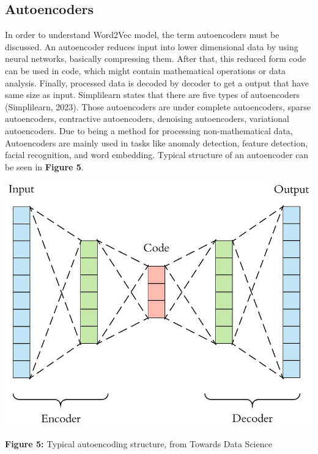 \documentclass[man]{apa7}
\begin{document}
\subsection{Autoencoders}

In order to understand Word2Vec model, the term autoencoders must be discussed. An autoencoder reduces input into lower dimensional data by using neural networks, basically compressing them. After that, this reduced form code can be used in code, which might contain mathematical operations or data analysis. Finally, processed data is decoded by decoder to get a output that have same size as input. Simplilearn states that there are five types of autoencoders (Simplilearn, 2023). Those autoencoders are under complete autoencoders, sparse autoencoders, contractive autoencoders, denoising autoencoders, variational autoencoders.
Due to being a method for processing non-mathematical data, Autoencoders are mainly used in tasks like anomaly detection, feature detection, facial recognition, and word embedding. Typical structure of an autoencoder can be seen in \textbf{Figure 5}.\\

\begin{center}

\includegraphics[scale=0.4]{autoencoding.jpg}

\textbf{Figure 5:} Typical autoencoding structure, from Towards Data Science\\[2\baselineskip]

\end{center}
\end{document}
